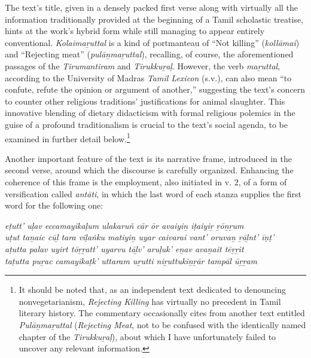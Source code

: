 The text’s title, given in a densely packed first verse along with virtually all the information traditionally provided at the beginning of a Tamil scholastic treatise, hints at the work’s hybrid form while still managing to appear entirely conventional. \emph{{Kolaimaṟuttal}} is a kind of portmanteau of “Not killing” (\emph{kollāmai}) and “Rejecting meat” (\emph{pulāṉmaṟuttal}), recalling, of course, the aforementioned passages of the \emph{{Tirumantiram}} and \emph{{Tirukkuṟaḷ}}. However, the verb \emph{maṟuttal}, according to the University of Madras \emph{Tamil Lexicon} (s.v.), can also mean “to confute, refute the opinion or argument of another,” suggesting the text’s concern to counter other religious traditions’ justifications for animal slaughter. This innovative blending of dietary didacticism with formal religious polemics in the guise of a profound traditionalism is crucial to the text’s social agenda, to be examined in further detail below.\footnote{%
It should be noted that, as an independent text dedicated to denouncing nonvegetarianism, \emph{Rejecting Killing} has virtually no precedent in Tamil literary history. The commentary occasionally cites from another text entitled \emph{{Pulāṉmaṟuttal}} (\emph{Rejecting Meat}, not to be confused with the identically named chapter of the \emph{{Tirukkuṟaḷ}}), about which I have unfortunately failed to uncover any relevant information.
}



Another important feature of the text is its narrative frame, introduced in the second verse, around which the discourse is carefully organized. Enhancing the coherence of this frame is the employment, also initiated in v. 2, of a form of versification called \emph{antāti}, in which the last word of each stanza supplies the first word for the following one:

\begin{pullquote}\raggedright
      \emph{eṭutt’ uḷav eccamayikaḷum ulakaruñ cār ōr avaiyiṉ iṭaiyiṟ ṟōṉṟum}\\
\emph{uṭut taṉaic cūḻ tara viḷaṅku matiyiṉ uyar caivarai vant’ oruvaṉ ṟāḻnt’ īṇṭ’}\\
\emph{aṭutta palav uyirt tōṟṟatt’ uyarvu tāḻv’ aruḷuk’ eṉav avaṉait tēṟṟit}\\
\emph{taṭutta puṟac camayikaṭk’ uttaram uṟutti niṟuttukiṉṟār tampāl ūṟṟam}
\end{pullquote}
      
